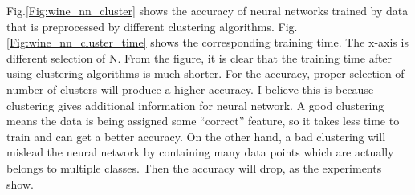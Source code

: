 \documentclass[11pt]{article}
\begin{document}
Fig.\ref{Fig:wine_nn_cluster} shows the accuracy of neural networks trained by data that is preprocessed by different clustering algorithms. Fig.\ref{Fig:wine_nn_cluster_time} shows the corresponding training time. The x-axis is different selection of N. From the figure, it is clear that the training time after using clustering algorithms is much shorter. For the accuracy, proper selection of number of clusters will produce a higher accuracy. I believe this is because clustering gives additional information for neural network. A good clustering means the data is being assigned some ``correct'' feature, so it takes less time to train and can get a better accuracy. On the other hand, a bad clustering will mislead the neural network by containing many data points which are actually belongs to multiple classes. Then the accuracy will drop, as the experiments show.
\end{document}
